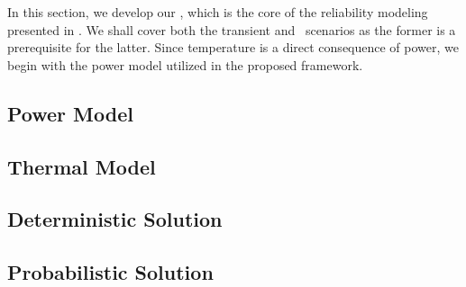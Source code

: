 In this section, we develop our \ta, which is the core of the reliability modeling presented in .
We shall cover both the transient and \dss\ scenarios as the former is a prerequisite for the latter.
Since temperature is a direct consequence of power, we begin with the power model utilized in the proposed framework.

\subsection{Power Model} 


\subsection{Thermal Model} 


\subsection{Deterministic Solution} 


\subsection{Probabilistic Solution} 

